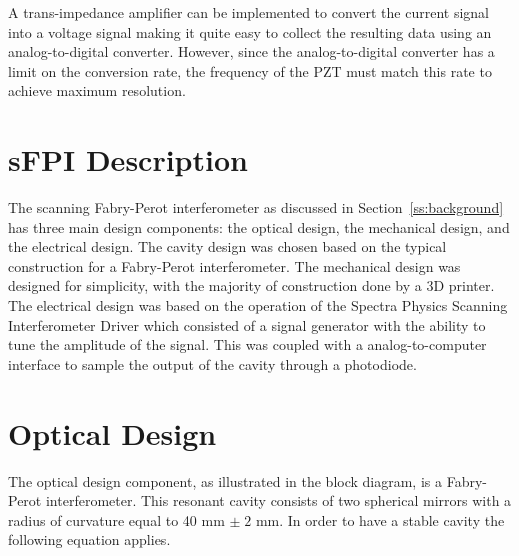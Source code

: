 \documentclass[12pt,journal]{IEEEtran}
\begin{document}
A trans-impedance amplifier can be implemented to convert the current signal into a voltage signal making it quite easy to collect the resulting data using an analog-to-digital converter. However, since the analog-to-digital converter has a limit on the conversion rate, the frequency of the PZT must match this rate to achieve maximum resolution.



\section{sFPI Description}

The scanning Fabry-Perot interferometer as discussed in Section~\ref{ss:background} has three main design components: the optical design, the mechanical design, and the electrical design. The cavity design was chosen based on the typical construction for a Fabry-Perot interferometer. The mechanical design was designed for simplicity, with the majority of construction done by a 3D printer. The electrical design was based on the operation of the Spectra Physics Scanning Interferometer Driver which consisted of a signal generator with the ability to tune the amplitude of the signal. This was coupled with a analog-to-computer interface to sample the output of the cavity through a photodiode.  



\section{Optical Design} \label{ss:optical_design}

The optical design component, as illustrated in the block diagram, is a Fabry-Perot interferometer. This resonant cavity consists of two spherical mirrors with a radius of curvature equal to 40 mm $\pm\;2$ mm. In order to have a stable cavity the following equation applies.
\end{document}
